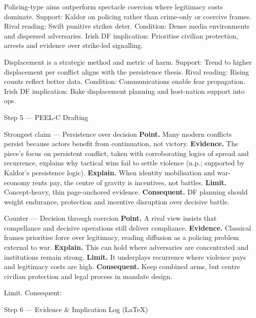 Policing-type aims outperform spectacle coercion where legitimacy costs dominate.
Support: Kaldor on policing rather than crime-only or coercive frames.
Rival reading: Swift punitive strikes deter.
Condition: Dense media environments and dispersed adversaries.
Irish DF implication: Prioritise civilian protection, arrests and evidence over strike-led signalling.

Displacement is a strategic method and metric of harm.
Support: Trend to higher displacement per conflict aligns with the persistence thesis.
Rival reading: Rising counts reflect better data.
Condition: Communications enable fear propagation.
Irish DF implication: Bake displacement planning and host-nation support into ops.

Step 5 — PEEL-C Drafting

Strongest claim — Persistence over decision
\textbf{Point.} Many modern conflicts persist because actors benefit from continuation, not victory.
\textbf{Evidence.} The piece’s focus on persistent conflict, taken with corroborating logics of spread and recurrence, explains why tactical wins fail to settle violence (n.p.; supported by Kaldor’s persistence logic).
\textbf{Explain.} When identity mobilisation and war-economy rents pay, the centre of gravity is incentives, not battles.
\textbf{Limit.} Concept-heavy, thin page-anchored evidence.
\textbf{Consequent.} DF planning should weight endurance, protection and incentive disruption over decisive battle.

Counter — Decision through coercion
\textbf{Point.} A rival view insists that compellance and decisive operations still deliver compliance.
\textbf{Evidence.} Classical frames prioritise force over legitimacy, reading diffusion as a policing problem external to war.
\textbf{Explain.} This can hold where adversaries are concentrated and institutions remain strong.
\textbf{Limit.} It underplays recurrence where violence pays and legitimacy costs are high.
\textbf{Consequent.} Keep combined arms, but centre civilian protection and legal process in mandate design.

Limit. Consequent:

Step 6 — Evidence \& Implication Log (LaTeX)

